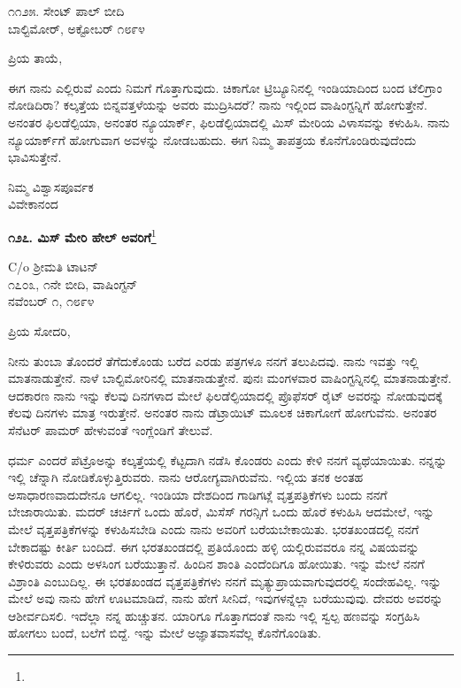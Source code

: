\vspace{-0.5cm}

\begin{flushright}
೧೧೨೫. ಸೇಂಟ್ ಪಾಲ್ ಬೀದಿ\\ಬಾಲ್ಟಿಮೋರ್‌, ಅಕ್ಟೋಬರ್ ೧೮೯೪
\end{flushright}

\vspace{-0.5cm}

\noindent
ಪ್ರಿಯ ತಾಯೆ,

ಈಗ ನಾನು ಎಲ್ಲಿರುವೆ ಎಂದು ನಿಮಗೆ ಗೊತ್ತಾಗುವುದು. ಚಿಕಾಗೋ ಟ್ರಿಬ್ಯೂನಿನಲ್ಲಿ ಇಂಡಿಯಾದಿಂದ ಬಂದ ಟೆಲಿಗ್ರಾಂ ನೋಡಿದಿರಾ? ಕಲ್ಕತ್ತೆಯ ಬಿನ್ನವತ್ತಳೆಯನ್ನು ಅವರು ಮುದ್ರಿಸಿದರೆ? ನಾನು ಇಲ್ಲಿಂದ ವಾಷಿಂಗ್ಟನ್ನಿಗೆ ಹೋಗುತ್ತೇನೆ. ಅನಂತರ ಫಿಲಡೆಲ್ಪಿಯಾ, ಅನಂತರ ನ್ಯೂಯಾರ್ಕ್, ಫಿಲಡೆಲ್ಪಿಯಾದಲ್ಲಿ ಮಿಸ್ ಮೇರಿಯ ವಿಳಾಸವನ್ನು ಕಳುಹಿಸಿ. ನಾನು ನ್ಯೂಯಾರ್ಕ್‌ಗೆ ಹೋಗುವಾಗ ಅವಳನ್ನು ನೋಡಬಹುದು. ಈಗ ನಿಮ್ಮ ತಾಪತ್ರಯ ಕೊನೆಗೊಂಡಿರುವುದೆಂದು ಭಾವಿಸುತ್ತೇನೆ.

\vspace{-0.5cm}

{\flushright
ನಿಮ್ಮ ವಿಶ್ವಾಸಪೂರ್ವಕ\\ವಿವೇಕಾನಂದ\par}

\begin{center}
\textbf{೧೨೭. ಮಿಸ್ ಮೇರಿ ಹೇಲ್‌ ಅವರಿಗೆ}\footnote{}
\end{center}

\begin{flushright}
C/o ಶ‍್ರೀಮತಿ ಟಾಟನ್\\೧೭೦೩, ೧ನೇ ಬೀದಿ, ವಾಷಿಂಗ್ಟನ್\\ನವೆಂಬರ್ ೧, ೧೮೯೪
\end{flushright}

\noindent
ಪ್ರಿಯ ಸೋದರಿ,

ನೀನು ತುಂಬಾ ತೊಂದರೆ ತೆಗೆದುಕೊಂಡು ಬರೆದ ಎರಡು ಪತ್ರಗಳೂ ನನಗೆ ತಲುಪಿದವು. ನಾನು ಇವತ್ತು ಇಲ್ಲಿ ಮಾತನಾಡುತ್ತೇನೆ. ನಾಳೆ ಬಾಲ್ಟಿಮೋರಿನಲ್ಲಿ ಮಾತನಾಡುತ್ತೇನೆ. ಪುನಃ ಮಂಗಳವಾರ ವಾಷಿಂಗ್ಟನ್ನಿನಲ್ಲಿ ಮಾತನಾಡುತ್ತೇನೆ. ಆದಕಾರಣ ನಾನು ಇನ್ನು ಕೆಲವು ದಿನಗಳಾದ ಮೇಲೆ ಫಿಲಡೆಲ್ಫಿಯಾದಲ್ಲಿ ಪ್ರೊಫೆಸರ್ ರೈಟ್ ಅವರನ್ನು ನೋಡುವುದಕ್ಕೆ ಕೆಲವು ದಿನಗಳು ಮಾತ್ರ ಇರುತ್ತೇನೆ. ಅನಂತರ ನಾನು ಡೆಟ್ರಾಯಿಟ್ ಮೂಲಕ ಚಿಕಾಗೋಗೆ ಹೋಗುವೆನು. ಅನಂತರ ಸೆನೆಟರ್ ಪಾಮರ್ ಹೇಳುವಂತೆ ಇಂಗ್ಲೆಂಡಿಗೆ ತೇಲುವೆ.

ಧರ್ಮ ಎಂದರೆ  ಪೆಟ್ರೊಅನ್ನು ಕಲ್ಕತ್ತೆಯಲ್ಲಿ ಕೆಟ್ಟದಾಗಿ ನಡೆಸಿ ಕೊಂಡರು ಎಂದು ಕೇಳಿ ನನಗೆ ವ್ಯಥೆಯಾಯಿತು. ನನ್ನನ್ನು ಇಲ್ಲಿ ಚೆನ್ನಾಗಿ ನೋಡಿಕೊಳ್ಳುತ್ತಿರುವರು. ನಾನು ಆರೋಗ್ಯವಾಗಿರುವೆನು. ಇಲ್ಲಿಯ ತನಕ ಅಂತಹ ಅಸಾಧಾರಣವಾದುದೇನೂ ಆಗಲಿಲ್ಲ. ಇಂಡಿಯಾ ದೇಶದಿಂದ ಗಾಡಿಗಟ್ಲೆ ವೃತ್ತಪತ್ರಿಕೆಗಳು ಬಂದು ನನಗೆ ಬೇಜಾರಾಯಿತು. ಮದರ್‌ ಚರ್ಚಿಗೆ ಒಂದು ಹೊರೆ, ಮಿಸೆಸ್ ಗರನ್ಸಿಗೆ ಒಂದು ಹೊರೆ ಕಳುಹಿಸಿ ಆದಮೇಲೆ, ಇನ್ನು ಮೇಲೆ ವೃತ್ತಪತ್ರಿಕೆಗಳನ್ನು ಕಳುಹಿಸಬೇಡಿ ಎಂದು ನಾನು ಅವರಿಗೆ ಬರೆಯಬೇಕಾಯಿತು. ಭರತಖಂಡದಲ್ಲಿ ನನಗೆ ಬೇಕಾದಷ್ಟು ಕೀರ್ತಿ ಬಂದಿದೆ. ಈಗ ಭರತಖಂಡದಲ್ಲಿ ಪ್ರತಿಯೊಂದು ಹಳ್ಳಿ ಯಲ್ಲಿರುವವರೂ ನನ್ನ ವಿಷಯವನ್ನು ಕೇಳಿರುವರು ಎಂದು ಅಳಸಿಂಗ ಬರೆಯುತ್ತಾನೆ. ಹಿಂದಿನ ಶಾಂತಿ ಎಂದೆಂದಿಗೂ ಹೋಯಿತು. ಇನ್ನು ಮೇಲೆ ನನಗೆ ವಿಶ್ರಾಂತಿ ಎಂಬುದಿಲ್ಲ. ಈ ಭರತಖಂಡದ ವೃತ್ತಪತ್ರಿಕೆಗಳು ನನಗೆ ಮೃತ್ಯುಪ್ರಾಯವಾಗುವುದರಲ್ಲಿ ಸಂದೇಹವಿಲ್ಲ. ಇನ್ನು ಮೇಲೆ ಅವು ನಾನು ಹೇಗೆ ಊಟಮಾಡಿದೆ, ನಾನು ಹೇಗೆ ಸೀನಿದೆ, ಇವುಗಳನ್ನೆಲ್ಲಾ ಬರೆಯುವುವು. ದೇವರು ಅವರನ್ನು ಆಶೀರ್ವದಿಸಲಿ. ಇದೆಲ್ಲಾ ನನ್ನ ಹುಚ್ಚುತನ. ಯಾರಿಗೂ ಗೊತ್ತಾಗದಂತೆ ನಾನು ಇಲ್ಲಿ ಸ್ವಲ್ಪ ಹಣವನ್ನು ಸಂಗ್ರಹಿಸಿ ಹೋಗಲು ಬಂದೆ, ಬಲೆಗೆ ಬಿದ್ದೆ. ಇನ್ನು ಮೇಲೆ ಅಜ್ಞಾತವಾಸವೆಲ್ಲ ಕೊನೆಗೊಂಡಿತು.

